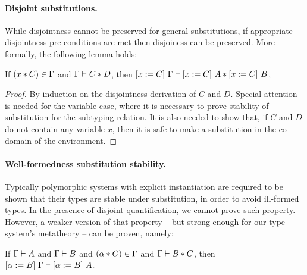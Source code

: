 \paragraph{Disjoint substitutions.}
While disjointness cannot be preserved for general substitutions,
if appropriate disjointness pre-conditions are met then disjoiness can
be preserved. More formally, the following lemma holds: 

\begin{lemma}
  \label{lemma:orthosubst}

  If $(x \disjoint C) \in \Gamma$ and $\jdis \Gamma C D$, 
  then $\jdis {\subst C x \Gamma} {\subst C x A} {\subst C x B}$,
\end{lemma}

\begin{proof}
  By induction on the disjointness derivation of $C$ and $D$.
  Special attention is needed for the variable case, where it is necessary to prove stability
  of substitution for the subtyping relation.
  It is also needed to show that, if $C$ and $D$ do not contain any variable $x$, then it is
  safe to make a substitution in the co-domain of the environment.
\end{proof}

\paragraph{Well-formedness substitution stability.}
Typically polymorphic systems with explicit instantiation are required to be shown that their
types are stable under substitution, in order to avoid ill-formed types.
In the presence of disjoint quantification, we cannot prove such property.
However, a weaker version of that property -- but strong enough for our type-system's metatheory 
-- can be proven, namely:

\begin{lemma}
  \label{lemma:wfsubst}

  If $\jwf \Gamma A$ and $\jwf \Gamma B$ and $(\alpha \disjoint C) \in \Gamma$ 
  and $\jdis \Gamma B C$, then $\jwf {\subst B \alpha \Gamma} {\subst B \alpha A}$.
\end{lemma}
%

